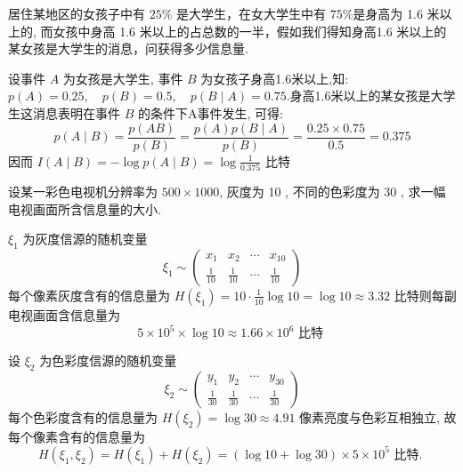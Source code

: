   \begin{exercise}
居住某地区的女孩子中有 $ 25 \% $ 是大学生，在女大学生中有 $ 75 \% $是身高为 1.6 米以上的, 而女孩中身高 1.6 米以上的占总数的一半，假如我们得知身高1.6 米以上的某女孩是大学生的消息，问获得多少信息量.
 \end{exercise}
 \begin{solution}
     设事件 $ A $ 为女孩是大学生, 事件 $ B $ 为女孩子身高1.6米以上,知: $ p(A)=0.25, \quad p(B)=0.5, \quad p(B \mid A)=0.75 $.身高1.6米以上的某女孩是大学生这消息表明在事件 $ B $ 的条件下A事件发生, 可得:
$$
p(A \mid B)=\frac{p(A B)}{p(B)}=\frac{p(A) p(B \mid A)}{p(B)}=\frac{0.25 \times 0.75}{0.5}=0.375
$$
因而 $ I(A \mid B)=-\log p(A \mid B)=\log \frac{1}{0.375} $ 比特
 \end{solution}
 \begin{exercise}
设某一彩色电视机分辨率为 $ 500 \times 1000 $, 灰度为 10 , 不同的色彩度为 30 , 求一幅电视画面所含信息量的大小.

 \end{exercise}
 \begin{solution}
     $ \xi_{1} $ 为灰度信源的随机变量
$$
\xi_{1} \sim\left(\begin{array}{cccc}
x_{1} & x_{2} & \cdots & x_{10} \\
\frac{1}{10} & \frac{1}{10} & \cdots & \frac{1}{10}
\end{array}\right)
$$
每个像素灰度含有的信息量为
$ H\left(\xi_{1}\right)=10 \cdot \frac{1}{10} \log 10=\log 10 \approx 3.32 $ 比特则每副电视画面含信息量为
$$
5 \times 10^{5} \times \log 10 \approx 1.66 \times 10^{6} \text { 比特 }
$$

设 $ \xi_{2} $ 为色彩度信源的随机变量
$$
\xi_{2} \sim\left(\begin{array}{cccc}
y_{1} & y_{2} & \cdots & y_{30} \\
\frac{1}{30} & \frac{1}{30} & \cdots & \frac{1}{30}
\end{array}\right)
$$
每个色彩度含有的信息量为 $ H\left(\xi_{2}\right)=\log 30 \approx 4.91 $ 像素亮度与色彩互相独立, 故每个像素含有的信息量为
$$
H\left(\xi_{1}, \xi_{2}\right)=H\left(\xi_{1}\right)+H\left(\xi_{2}\right)=(\log 10+\log 30) \times 5 \times 10^{5} \text { 比特. }
$$
 \end{solution}


 